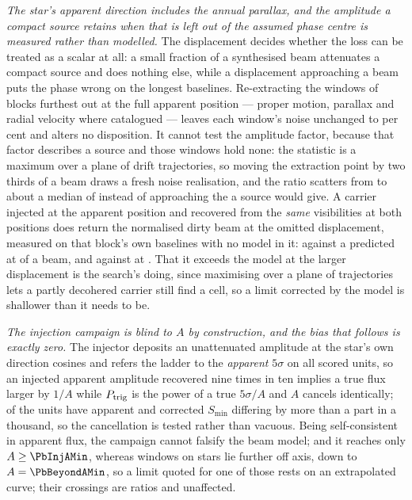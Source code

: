 \emph{The star's apparent direction includes the annual parallax, and the
amplitude a compact source retains when that is left out of the assumed phase
centre is measured rather than modelled.} The displacement decides whether the
loss can be treated as a scalar at all: a small fraction of a synthesised beam
attenuates a compact source and does nothing else, while a displacement
approaching a beam puts the phase wrong on the longest baselines. Re-extracting
the \SensNReextWin{} windows of \SensNReextBlock{} blocks furthest out at the
full apparent position --- proper motion, parallax and radial velocity where
catalogued --- leaves each window's noise unchanged to
\SensReextNoiseMaxPct{} per cent and alters no disposition. It cannot test
the amplitude factor, because that factor describes a source and those
windows hold none: the statistic is a maximum over a plane of drift
trajectories, so moving the extraction point by two thirds of a beam draws a
fresh noise realisation, and the ratio scatters from
\SensReTstarLo{} to \SensReTstarHi{} about a median of \SensReTstarMed{}
instead of approaching the \SensPxLargePred{} a source would give. A
carrier injected at the apparent position and recovered from the \emph{same}
visibilities at both positions does return the normalised dirty beam at the
omitted displacement, measured on that block's own baselines with no model in
it: \SensPxSmallMeas{} against a predicted \SensPxSmallPred{} at
\SensPxSmallBeams{} of a beam, and \SensPxLargeMeas{} against
\SensPxLargePred{} at \SensPxLargeBeams. That it exceeds the model at the
larger displacement is the search's doing, since maximising over a plane of
trajectories lets a partly decohered carrier still find a cell, so a limit
corrected by the model is shallower than it needs to be.

\emph{The injection campaign is blind to $A$ by construction, and the bias
that follows is exactly zero.} The injector deposits an unattenuated amplitude
at the star's own direction cosines and refers the ladder to the
\emph{apparent} $5\sigma$ on all \PbInjNUnit{} scored units, so an injected
apparent amplitude recovered nine times in ten implies a true flux larger by
$1/A$ while $P_{\rm trig}$ is the power of a true $5\sigma/A$ and $A$ cancels
identically; \PbInjNDistinct{} of the units have apparent and corrected
$S_{\min}$ differing by more than a part in a thousand, so the cancellation
is tested rather than vacuous. Being self-consistent in apparent flux, the
campaign cannot falsify the beam model; and it reaches only
$A\ge\PbInjAMin$, whereas \PbNBeyond{} windows on \PbNBeyondStar{} stars lie
further off axis, down to $A=\PbBeyondAMin$, so a limit quoted for one of
those rests on an extrapolated curve; their \PbNBeyondCross{} crossings are
ratios and unaffected.

